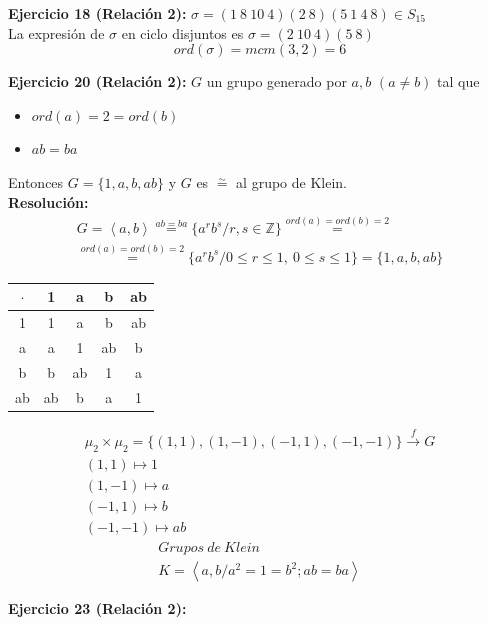 \documentclass{article}
\begin{document}
\textbf{Ejercicio 18 (Relación 2):} $\sigma=(1\:8\:10\:4)(2\:8)(5\:1\:4\:8)\in S_{15}$ \\

La expresión de $\sigma$ en ciclo disjuntos es $\sigma=(2\:10\:4)(5\:8)$ 
\begin{equation*}
ord(\sigma)=mcm(3,2)=6
\end{equation*}

\textbf{Ejercicio 20 (Relación 2):} $G$ un grupo generado por $a,b$ $(a\neq b)$ tal que
\begin{itemize}
\item $ord(a)=2=ord(b)$
\item $ab=ba$
\end{itemize}

Entonces $G=\{1,a,b,ab\}$ y $G$ es $\overset{\sim}{=}$ al grupo de Klein. \\

\textbf{Resolución:} 
\begin{gather*}
G=\left\langle a,b\right\rangle \overset{ab=ba}{=}\{a^rb^s/r,s\in \mathbb{Z}\}\overset{ord(a)=ord(b)=2}{=} \\
\overset{ord(a)=ord(b)=2}{=}\{a^rb^s/0\leq r\leq 1,\:0\leq s\leq 1\}=\{1,a,b,ab\}
\end{gather*}

\begin{center}
\begin{tabular}{c | c c c c}
$\cdot$ & 1 & a & b & ab \\
\hline
1 & 1 & a & b & ab \\
a & a & 1 & ab & b \\
b & b & ab & 1 & a \\
ab & ab & b & a & 1
\end{tabular}
\end{center}

\begin{gather*}
\mu_2\times\mu_2=\{(1,1),(1,-1),(-1,1),(-1,-1)\}\overset{f}{\rightarrow} G \\
(1,1)\mapsto 1 \\
(1,-1)\mapsto a \\
(-1,1)\mapsto b \\
(-1,-1)\mapsto ab
\end{gather*}
\begin{gather*}
Grupos\:de\:Klein\\
K=\left\langle a,b/a^2=1=b^2;ab=ba \right\rangle
\end{gather*}

\textbf{Ejercicio 23 (Relación 2):} 
\end{document}
